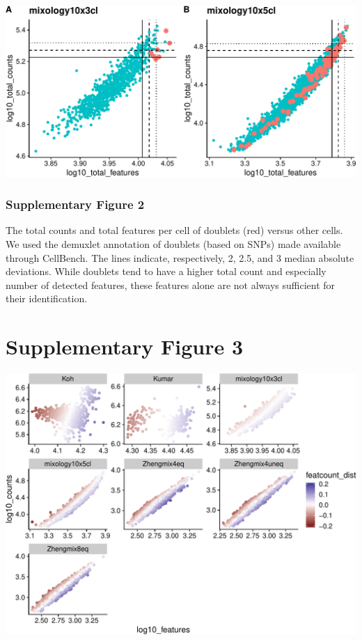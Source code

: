 \documentclass[]{article}
\begin{document}
\includegraphics{supp_figures_files/figure-latex/mixology_doublet_featcount-1.pdf}

\hypertarget{supplementary-figure-2-1}{%
\subsubsection{Supplementary Figure 2}\label{supplementary-figure-2-1}}

The total counts and total features per cell of doublets (red) versus
other cells. We used the demuxlet annotation of doublets (based on SNPs)
made available through CellBench. The lines indicate, respectively, 2,
2.5, and 3 median absolute deviations. While doublets tend to have a
higher total count and especially number of detected features, these
features alone are not always sufficient for their identification.

\newpage

\hypertarget{supplementary-figure-3}{%
\section{Supplementary Figure 3}\label{supplementary-figure-3}}

\includegraphics{supp_figures_files/figure-latex/featcount_ratio-1.pdf}
\end{document}
